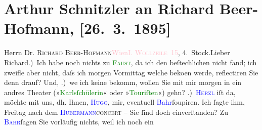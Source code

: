 

               \section[Arthur Schnitzler an Richard Beer-Hofmann, {[}26. 3. 1895{]}]{ Arthur Schnitzler an Richard Beer-Hofmann, {[}26. 3. 1895{]}}\nopagebreak{}\rehead{ }\normalsize\beginnumbering{} \toendnotes[C]{\smallbreak\pagebreak[2]} 
\toendnotes[C]{\smallbreak}\pstart{}{\pb}Herrn Dr. \textsc{Richard
                     Beer-Hofmann}\pend{}\pstart{}\textcolor{pink}{Wien}{}\ledrightnote{\textcolor{pink}{Wien}}\pend{}\pstart{}\textsc{\textcolor{pink}{I. Wollzeile 15}{}\ledrightnote{\textcolor{pink}{Wollzeile}}}, 4. Stock.\pend{}{\bigskip}\pstart\center{}{\pb}Lieber Richard.\pend{}) Ich habe noch nichts zu \textcolor{green}{\textsc{Faust}}{}\ledrightnote{\textcolor{green}{Faust}}, da ich den beſtechlichen nicht fand; ich zweifle aber nicht, daſs ich morgen
               Vormittag welche beko{\geminationm}en werde, reflectiren Sie denn
               drauf? Und,\pend
           .) we{\geminationn} ich keine bekomm, wollen Sie mit mir morgen in
               ein andres Theater (»\textcolor{green}{Karlsſchülerin}{}\ledrightnote{\textcolor{green}{Die Karlsschülerin}}« oder »\textcolor{green}{Touriſten}{}\ledrightnote{\textcolor{green}{Wiener Touristen}}«) gehn?\pend
           .) \textcolor{blue}{\textsc{Herzl}}{}\ledrightnote{\textcolor{blue}{Theodor Herzl}} iſt da, möchte mit uns, {\pb}dh. Ihnen, \textcolor{blue}{\textsc{Hugo}}{}\ledrightnote{\textcolor{blue}{Hugo von Hofmannsthal}}, mir, eventuell \textcolor{blue}{Bahr}{}\ledrightnote{\textcolor{blue}{Hermann Bahr}}{ }ſoupiren. Ich ſagte ihm, Freitag nach dem \textcolor{blue}{\textsc{Hubermann}}{}\ledrightnote{\textcolor{blue}{Bronisław Huberman}}\textsc{concert} – Sie ſind doch einverſtanden? Zu \textcolor{blue}{\textsc{Bahr}}{}\ledrightnote{\textcolor{blue}{Hermann Bahr}}{ }ſagen Sie vorläufig nichts, weil ich noch ein
